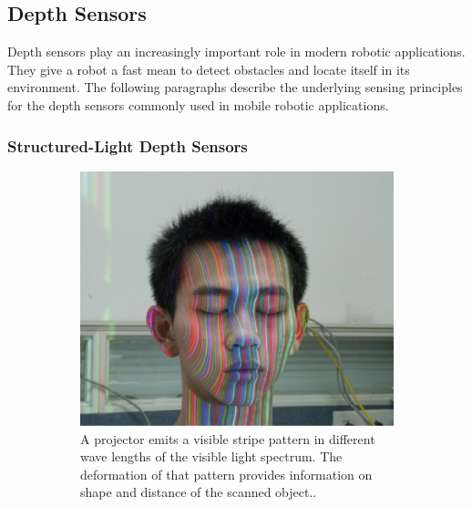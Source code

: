 \subsection{Depth Sensors}

Depth sensors play an increasingly important role in modern robotic applications.
They give a robot a fast mean to detect obstacles and locate itself in its environment.
The following paragraphs describe the underlying sensing principles\cite{blais_2003} for the depth sensors commonly used in mobile robotic applications.

\subsubsection{Structured-Light Depth Sensors}

\begin{figure}[H]
    \centering
    \begin{subfigure}[t]{0.45\textwidth}
        \includegraphics[width=\textwidth]{chapter03/img/depth_pattern_face.png}
        \caption{A projector emits a visible stripe pattern in different wave lengths of the visible light spectrum. The deformation of that pattern provides information on shape and distance of the scanned object.\cite{sl_depthsensor_calibration}.}
    \end{subfigure}
    \begin{subfigure}[t]{0.45\textwidth}

\end{subfigure}
\end{figure}
